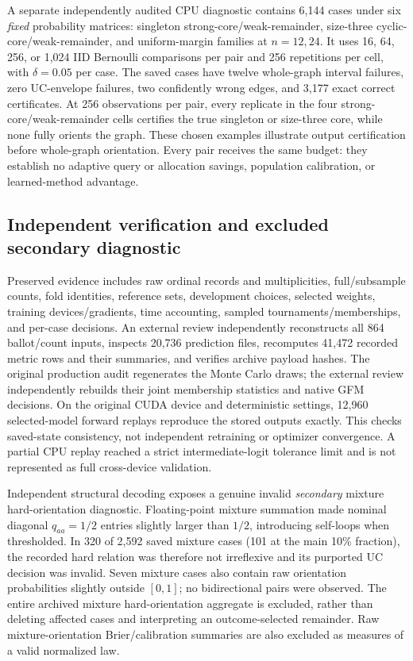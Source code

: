A separate independently audited CPU diagnostic contains 6,144 cases under six \emph{fixed} probability matrices: singleton strong-core/weak-remainder, size-three cyclic-core/weak-remainder, and uniform-margin families at $n=12,24$. It uses 16, 64, 256, or 1,024 IID Bernoulli comparisons per pair and 256 repetitions per cell, with $\delta=0.05$ per case. The saved cases have twelve whole-graph interval failures, zero UC-envelope failures, two confidently wrong edges, and 3,177 exact correct certificates. At 256 observations per pair, every replicate in the four strong-core/weak-remainder cells certifies the true singleton or size-three core, while none fully orients the graph. These chosen examples illustrate output certification before whole-graph orientation. Every pair receives the same budget: they establish no adaptive query or allocation savings, population calibration, or learned-method advantage.

\subsection{Independent verification and excluded secondary diagnostic}
Preserved evidence includes raw ordinal records and multiplicities, full/subsample counts, fold identities, reference sets, development choices, selected weights, training devices/gradients, time accounting, sampled tournaments/memberships, and per-case decisions. An external review independently reconstructs all 864 ballot/count inputs, inspects 20,736 prediction files, recomputes 41,472 recorded metric rows and their summaries, and verifies archive payload hashes. The original production audit regenerates the Monte Carlo draws; the external review independently rebuilds their joint membership statistics and native GFM decisions. On the original CUDA device and deterministic settings, 12,960 selected-model forward replays reproduce the stored outputs exactly. This checks saved-state consistency, not independent retraining or optimizer convergence. A partial CPU replay reached a strict intermediate-logit tolerance limit and is not represented as full cross-device validation.

Independent structural decoding exposes a genuine invalid \emph{secondary} mixture hard-orientation diagnostic. Floating-point mixture summation made nominal diagonal $q_{aa}=1/2$ entries slightly larger than $1/2$, introducing self-loops when thresholded. In 320 of 2,592 saved mixture cases (101 at the main 10\% fraction), the recorded hard relation was therefore not irreflexive and its purported UC decision was invalid. Seven mixture cases also contain raw orientation probabilities slightly outside $[0,1]$; no bidirectional pairs were observed. The entire archived mixture hard-orientation aggregate is excluded, rather than deleting affected cases and interpreting an outcome-selected remainder. Raw mixture-orientation Brier/calibration summaries are also excluded as measures of a valid normalized law.

